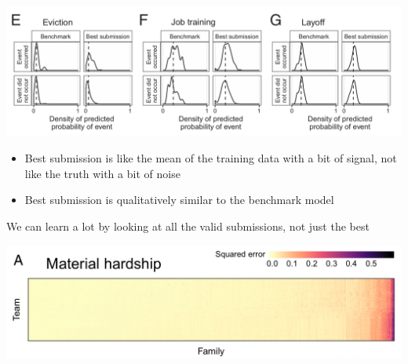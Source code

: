\documentclass[aspectratio=169]{beamer}
\begin{document}
\begin{frame}

\begin{center}
\includegraphics[width=\textwidth]{figures/salganik_measuring_2020_fig3e-g}
\end{center}

\begin{itemize}
\item Best submission is like the mean of the training data with a bit of signal, not like the truth with a bit of noise
\item Best submission is qualitatively similar to the benchmark model 
\end{itemize}

\end{frame}
\begin{frame}

We can learn a lot by looking at all the valid submissions, not just the best

\end{frame}
\begin{frame}

\begin{center}
\includegraphics[width=\textwidth]{figures/salganik_measuring_2020_fig4a}
\end{center}

\end{frame}
\end{document}
